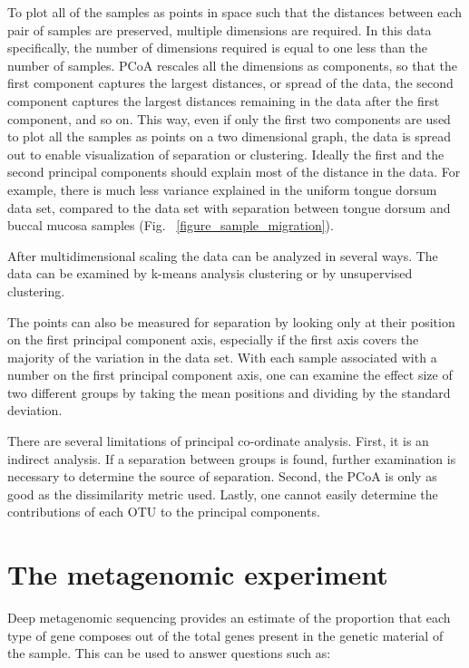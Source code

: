 To plot all of the samples as points in space such that the distances between each pair of samples are preserved, multiple dimensions are required. In this data specifically, the number of dimensions required is equal to one less than the number of samples. PCoA rescales all the dimensions as components, so that the first component captures the largest distances, or spread of the data, the second component captures the largest distances remaining in the data after the first component, and so on. This way, even if only the first two components are used to plot all the samples as points on a two dimensional graph, the data is spread out to enable visualization of separation or clustering. Ideally the first and the second principal components should explain most of the distance in the data. For example, there is much less variance explained in the uniform tongue dorsum data set, compared to the data set with separation between tongue dorsum and buccal mucosa samples (Fig. ~\ref{figure_sample_migration}).

After multidimensional scaling the data can be analyzed in several ways. The data can be examined by k-means analysis clustering \cite{tibshirani2005cluster} or by unsupervised clustering.

The points can also be measured for separation by looking only at their position on the first principal component axis, especially if the first axis covers the majority of the variation in the data set. With each sample associated with a number on the first principal component axis, one can examine the effect size of two different groups by taking the mean positions and dividing by the standard deviation.

There are several limitations of principal co-ordinate analysis. First, it is an indirect analysis. If a separation between groups is found, further examination is necessary to determine the source of separation. Second, the PCoA is only as good as the dissimilarity metric used. Lastly, one cannot easily determine the contributions of each OTU to the principal components.

\section{The metagenomic experiment}
Deep metagenomic sequencing provides an estimate of the proportion that each type of gene composes out of the total genes present in the genetic material of the sample. This can be used to answer questions such as:

